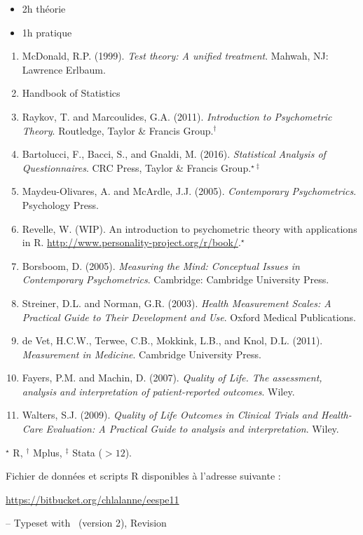 
\begin{itemize}
\item 2h théorie
\item 1h pratique
\end{itemize}



\begin{enumerate}
\item McDonald, R.P. (1999). \emph{Test theory: A unified treatment}. Mahwah,
  NJ: Lawrence Erlbaum.
\item Handbook of Statistics
\item Raykov, T. and Marcoulides, G.A. (2011). \emph{Introduction to
    Psychometric Theory}. Routledge, Taylor \& Francis Group.$^\dagger$
\item Bartolucci, F., Bacci, S., and Gnaldi, M. (2016). \emph{Statistical Analysis of
  Questionnaires}. CRC Press, Taylor \& Francis Group.$^{\star\ddagger}$
\item Maydeu-Olivares, A. and McArdle, J.J. (2005). \emph{Contemporary
    Psychometrics}. Psychology Press.
\item Revelle, W. (WIP). An introduction to psychometric theory with
  applications in R. \url{http://www.personality-project.org/r/book/}.$^\star$
\item Borsboom, D. (2005). \emph{Measuring the Mind: Conceptual Issues in
    Contemporary Psychometrics}. Cambridge: Cambridge University Press.
\item Streiner, D.L. and Norman, G.R. (2003). \emph{Health Measurement Scales: A
    Practical Guide to Their Development and Use}. Oxford Medical Publications.
\item de Vet, H.C.W., Terwee, C.B., Mokkink, L.B., and Knol, D.L. (2011).
  \emph{Measurement in Medicine}. Cambridge University Press.
\item Fayers, P.M. and Machin, D. (2007). \emph{Quality of Life. The assessment,
  analysis and interpretation of patient-reported outcomes}. Wiley.
\item Walters, S.J. (2009). \emph{Quality of Life Outcomes in Clinical Trials
    and Health-Care Evaluation: A Practical Guide to analysis and
    interpretation}. Wiley.
\end{enumerate}

{\small $^\star$ R, $^\dagger$ Mplus, $^\ddagger$ Stata ($>12$).}

\foilhead{}

Fichier de données et scripts R disponibles à l'adresse suivante :\newline
{\centering \url{https://bitbucket.org/chlalanne/eespe11}\par}
\vfill

\raggedleft \scriptsize -- Typeset with \FoilTeX\ (version 2), Revision \VCRevision







